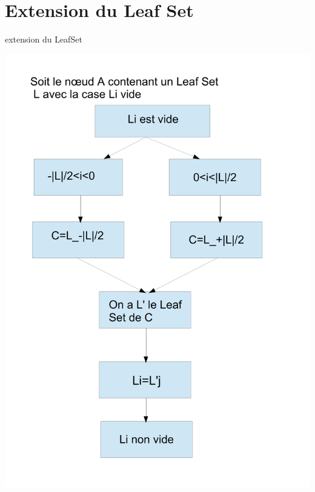 \documentclass[french]{beamer}
\begin{document}
\section{Extension du Leaf Set}
\begin{frame}{extension du LeafSet}
\begin{center}
\includegraphics[scale=0.28]{"schema_extension_leafset"}
\end{center}
\end{frame}
\end{document}
